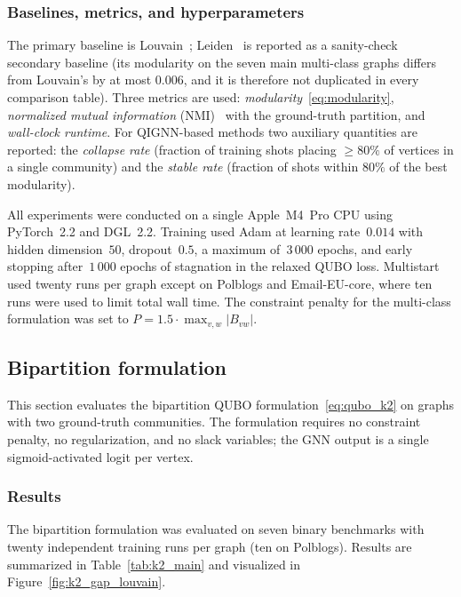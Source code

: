 \subsubsection{Baselines, metrics, and hyperparameters}
\label{sec:exp_baselines_metrics}

The primary baseline is Louvain~\cite{blondel2008louvain};
Leiden~\cite{traag2019leiden} is reported as a sanity-check
secondary baseline (its modularity on the seven main multi-class
graphs differs from Louvain's by at most $0.006$, and it is
therefore not duplicated in every comparison table). Three
metrics are used: \emph{modularity}~\eqref{eq:modularity},
\emph{normalized mutual information}
(NMI)~\cite{mcdaid2011normalized} with the ground-truth partition,
and \emph{wall-clock runtime}. For QIGNN-based methods two
auxiliary quantities are reported: the \emph{collapse rate}
(fraction of training shots placing $\geq\!80\%$ of vertices in a
single community) and the \emph{stable rate} (fraction of shots
within $80\%$ of the best modularity).

All experiments were conducted on a single Apple~M4~Pro CPU using
PyTorch~2.2 and DGL~2.2. Training used Adam at learning
rate~$0.014$ with hidden dimension~$50$, dropout~$0.5$, a
maximum of~$3\,000$ epochs, and early stopping after~$1\,000$
epochs of stagnation in the relaxed QUBO loss. Multistart used
twenty runs per graph except on Polblogs and Email-EU-core,
where ten runs were used to limit total wall time. The
constraint penalty for the multi-class formulation was set to
$P = 1.5 \cdot \max_{v,w} |B_{vw}|$.

\subsection{Bipartition formulation}
\label{sec:exp_k2}

This section evaluates the bipartition QUBO
formulation~\eqref{eq:qubo_k2} on graphs with two ground-truth
communities. The formulation requires no constraint penalty, no
regularization, and no slack variables; the GNN output is a single
sigmoid-activated logit per vertex.

\subsubsection{Results}
\label{sec:exp_k2_results}

The bipartition formulation was evaluated on seven binary
benchmarks with twenty independent training runs per graph (ten on
Polblogs). Results are summarized in Table~\ref{tab:k2_main} and
visualized in Figure~\ref{fig:k2_gap_louvain}.

